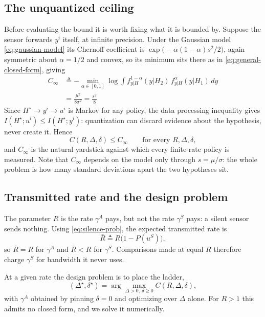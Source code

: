 \documentclass[conference]{IEEEtran}
\begin{document}
\subsection{The unquantized ceiling}
Before evaluating the bound it is worth fixing what it is bounded by.
Suppose the sensor forwards $y^i$ itself, at infinite precision.  Under the
Gaussian model \eqref{eq:gaussian-model} its Chernoff coefficient is
$\exp\big(-\alpha(1-\alpha)s^2/2\big)$, again symmetric about
$\alpha=1/2$ and convex, so its minimum sits there as in
\eqref{eq:general-closed-form}, giving
\begin{align}
 C_\infty&\triangleq-\min_{\alpha\in[0,1]}\log\int
 f_{y|H}^{1-\alpha}(y|H_2)\,f_{y|H}^{\alpha}(y|H_1)\,dy\nonumber\\
 &=\frac{\mu^2}{8\sigma^2}=\frac{s^2}{8}
 \label{eq:ceiling}
\end{align}
Since $H^\star\to y^i\to u^i$ is Markov for any policy, the data processing
inequality gives $I(H^\star;u^i)\le I(H^\star;y^i)$: quantization can
discard evidence about the hypothesis, never create it.  Hence
\begin{equation}
 C(R,\Delta,\delta)\le C_\infty\qquad\text{for every }R,\Delta,\delta,
 \label{eq:ceiling-bound}
\end{equation}
and $C_\infty$ is the natural yardstick against which every finite-rate
policy is measured.  Note that $C_\infty$ depends on the model only through
$s=\mu/\sigma$: the whole problem is how many standard deviations apart the
two hypotheses sit.

\subsection{Transmitted rate and the design problem}
The parameter $R$ is the rate $\gamma^A$ pays, but not the rate $\gamma^S$
pays: a silent sensor sends nothing.  Using \eqref{eq:silence-prob}, the
expected transmitted rate is
\begin{equation}
 \bar R\triangleq R\big(1-P(u^S)\big),
 \label{eq:mean-rate}
\end{equation}
so $\bar R=R$ for $\gamma^A$ and $\bar R<R$ for $\gamma^S$.  Comparisons
made at equal $R$ therefore charge $\gamma^S$ for bandwidth it never uses.

At a given rate the design problem is to place the ladder,
\begin{equation}
 (\Delta^\star,\delta^\star)
 =\arg\max_{\Delta>0,\ \delta\ge0}C(R,\Delta,\delta),
 \label{eq:design-problem}
\end{equation}
with $\gamma^A$ obtained by pinning $\delta=0$ and optimizing over $\Delta$
alone.  For $R>1$ this admits no closed form, and we solve it numerically.
\end{document}

